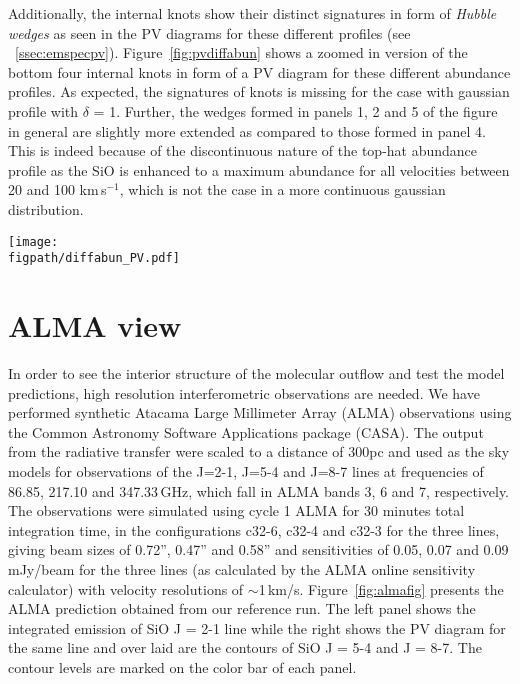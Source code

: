 \documentclass[useAMS,usenatbib]{mn2e}
\newcommand{\figpath}{/Users/bhargavvaidya/MyProject/work/Leeds_Uni/SiOJets_New/PAPER/PFIGS/}
\begin{document}
Additionally, the internal knots show their distinct signatures in
form of {\em Hubble wedges} as seen in the PV diagrams for these
different profiles (see
~\ref{ssec:emspecpv}). Figure~\ref{fig:pvdiffabun} shows a zoomed in
version of the bottom four internal knots in form of a PV diagram for these
different abundance profiles. As expected, the signatures of knots 
is missing for the case with gaussian profile with $\delta$ =
1. Further, the wedges formed in panels 1, 2 and 5 of the figure in
general are slightly more extended as compared to those
formed in panel 4. This is indeed because of the
discontinuous nature of the top-hat abundance profile as the SiO is
enhanced to a maximum abundance for all velocities between 20 and 100
km\,s$^{-1}$, which is not the case in a more continuous gaussian
distribution.

\begin{figure*}
 \texttt{[image: \\figpath/diffabun\_PV.pdf]}%
 \caption{Position-velocity maps of SiO(2-1) for the internal
   knots produced in the model with reference parameters and different abundance
   profiles. The contours mark different levels of emission in Kelvins, viz.,
   0.2,0.6,1.0,1.4,1.8,2.0,3.0,4.0.}
\label{fig:pvdiffabun}
\end{figure*}
   
 
\section{ALMA view}
\label{sec:ALMAview}
%
In order to see the interior structure of the molecular outflow and
test the model predictions, high
resolution interferometric observations are needed. 
We have performed synthetic Atacama Large Millimeter
Array (ALMA) observations using the Common Astronomy Software
Applications package (CASA). The output from the radiative transfer
were scaled to a distance of 300pc and used as the sky models for observations of
the J=2-1, J=5-4 and J=8-7 lines at frequencies of 86.85, 217.10 and
347.33$\,$GHz, which fall in ALMA bands 3, 6 and 7, respectively. The observations
were simulated using cycle 1 ALMA for 30 minutes total integration
time, in the configurations c32-6, c32-4 and c32-3 for the three
lines, giving beam sizes of 0.72'', 0.47'' and 0.58'' and
sensitivities of 0.05, 0.07 and 0.09$\,$mJy/beam for the three lines
(as calculated by the ALMA online sensitivity calculator) with
velocity resolutions of $\sim$1$\,$km/s.
 Figure~\ref{fig:almafig}
presents the ALMA prediction obtained from our reference run. The
left panel shows the integrated emission of SiO J = 2-1 line while the right
shows the PV diagram for the same line and over laid are
the contours of SiO J = 5-4 and J = 8-7. The contour levels are marked
on the color bar of each panel. 
\end{document}
